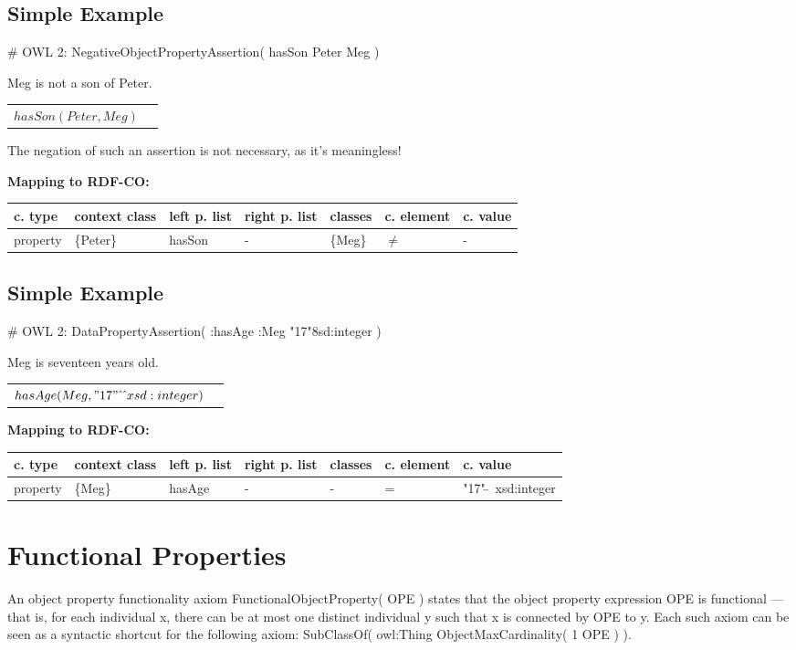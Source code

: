 \documentclass{llncs}
\newenvironment{gcotable}{
  \scriptsize
  \sffamily
  \vspace{0cm}
	\begin{center}
	\textbf{\vspace{0.4cm}Mapping to RDF-CO:} \\
  \begin{tabular}{l|l|l|l|l|l|l}
	\hline
  \textbf{c. type} & \textbf{context class} & \textbf{left p. list} & \textbf{right p. list} & \textbf{classes} & \textbf{c. element} & \textbf{c. value} \\
  \hline

}{
  \hline
  \end{tabular}
	\end{center}
}
\newenvironment{DL}{
  \vspace{0cm}
	\begin{center}
  \begin{tabular}{r l}

}{
  \end{tabular}
	\end{center}
}
\begin{document}
\subsection{Simple Example}

\begin{ex}
# OWL 2:
NegativeObjectPropertyAssertion( hasSon Peter Meg )
\end{ex}

Meg is not a son of Peter.

\begin{DL}
$hasSon(Peter,Meg)$\\
\end{DL}

The negation of such an assertion is not necessary, as it's meaningless!

\begin{gcotable}
property & \{Peter\} & hasSon & - & \{Meg\} & $\neq$ & - \\
\end{gcotable}

\subsection{Simple Example}

\begin{ex}
# OWL 2:
DataPropertyAssertion( :hasAge :Meg "17"^^xsd:integer )
\end{ex}

Meg is seventeen years old. 

\begin{DL}
$hasAge ( Meg ,"17"\hat{\ } \hat{\ } xsd:integer ) $\\
\end{DL}

\begin{gcotable}
property & \{Meg\} & hasAge & - & - & = & "17"$\hat{\ } \hat{\ }$ xsd:integer \\
\end{gcotable}

\section{Functional Properties}

An object property functionality axiom FunctionalObjectProperty( OPE ) states that the object property expression OPE is functional — that is, for each individual x, there can be at most one distinct individual y such that x is connected by OPE to y. Each such axiom can be seen as a syntactic shortcut for the following axiom: SubClassOf( owl:Thing ObjectMaxCardinality( 1 OPE ) ).
\end{document}
